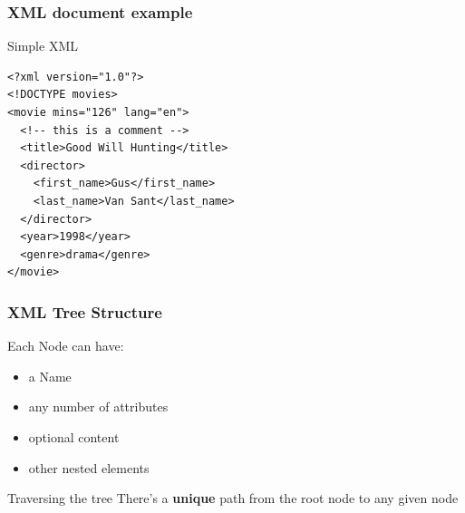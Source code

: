 \documentclass{beamer}\usepackage[]{graphicx}\usepackage[]{color}
\begin{document}

\begin{frame}[fragile]
\frametitle{XML document example}

\begin{block}{Simple XML}
\begin{verbatim}
<?xml version="1.0"?>
<!DOCTYPE movies>
<movie mins="126" lang="en">
  <!-- this is a comment -->
  <title>Good Will Hunting</title>
  <director>
    <first_name>Gus</first_name>
    <last_name>Van Sant</last_name>
  </director>
  <year>1998</year>
  <genre>drama</genre>
</movie>
\end{verbatim}
\end{block}

\end{frame}


\begin{frame}
\frametitle{XML Tree Structure}

\begin{block}{Each Node can have:}
\begin{itemize}
 \item a Name
 \item any number of attributes
 \item optional content
 \item other nested elements
\end{itemize}
\end{block}

\begin{block}{Traversing the tree}
There's a \textbf{unique} path from the root node to any given node 
\end{block}

\end{frame}

\end{document}
